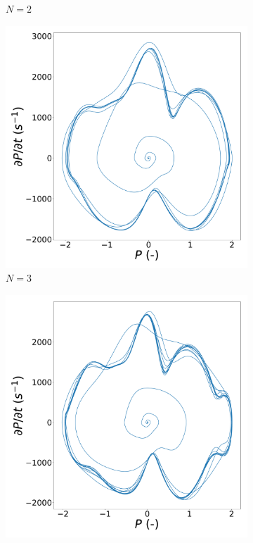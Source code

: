 \begin{figure}
\begin{subfigure}[b]{.24\linewidth}
        \caption{$N=2$}
        \label{fig:VDP_phase_N2}
    \end{subfigure}
    \hfill
    \begin{subfigure}[b]{.24\linewidth}
        \includegraphics[width=\linewidth]{img/phase_diagram_N3.pdf}
        \caption{$N=3$}
        \label{fig:VDP_phase_N3}
    \end{subfigure}
    \hfill
    \begin{subfigure}[b]{.24\linewidth}
        \includegraphics[width=\linewidth]{img/phase_diagram_N4.pdf}

\end{subfigure}
\end{figure}
